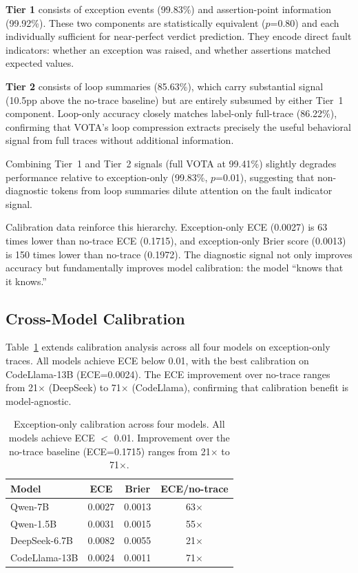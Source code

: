 \documentclass[11pt,a4paper]{article}
\begin{document}
\textbf{Tier 1} consists of exception events (99.83\%) and assertion-point information (99.92\%). These two components are statistically equivalent ($p$=0.80) and each individually sufficient for near-perfect verdict prediction. They encode direct fault indicators: whether an exception was raised, and whether assertions matched expected values.

\textbf{Tier 2} consists of loop summaries (85.63\%), which carry substantial signal (10.5pp above the no-trace baseline) but are entirely subsumed by either Tier~1 component. Loop-only accuracy closely matches label-only full-trace (86.22\%), confirming that VOTA's loop compression extracts precisely the useful behavioral signal from full traces without additional information.

Combining Tier~1 and Tier~2 signals (full VOTA at 99.41\%) slightly degrades performance relative to exception-only (99.83\%, $p$=0.01), suggesting that non-diagnostic tokens from loop summaries dilute attention on the fault indicator signal.

Calibration data reinforce this hierarchy. Exception-only ECE (0.0027) is 63 times lower than no-trace ECE (0.1715), and exception-only Brier score (0.0013) is 150 times lower than no-trace (0.1972). The diagnostic signal not only improves accuracy but fundamentally improves model calibration: the model ``knows that it knows.''

\subsection{Cross-Model Calibration}

Table~\ref{tab:calibration} extends calibration analysis across all four models on exception-only traces. All models achieve ECE below 0.01, with the best calibration on CodeLlama-13B (ECE=0.0024). The ECE improvement over no-trace ranges from 21$\times$ (DeepSeek) to 71$\times$ (CodeLlama), confirming that calibration benefit is model-agnostic.

\begin{table}[t]
\centering
\small
\begin{tabular}{lccc}
\toprule
\textbf{Model} & \textbf{ECE} & \textbf{Brier} & \textbf{ECE/no-trace} \\
\midrule
Qwen-7B & 0.0027 & 0.0013 & 63$\times$ \\
Qwen-1.5B & 0.0031 & 0.0015 & 55$\times$ \\
DeepSeek-6.7B & 0.0082 & 0.0055 & 21$\times$ \\
CodeLlama-13B & 0.0024 & 0.0011 & 71$\times$ \\
\bottomrule
\end{tabular}
\caption{Exception-only calibration across four models. All models achieve ECE $<$ 0.01. Improvement over the no-trace baseline (ECE=0.1715) ranges from 21$\times$ to 71$\times$.}
\label{tab:calibration}
\end{table}
\end{document}
